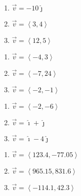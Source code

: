 \begin{multicols}{3}

\begin{enumerate}

\setcounter{enumi}{\value{HW}}

\item  $\vec{v} = -10 \hat{\jmath}$
\item  $\vec{v} = \left< 3,4\right>$
\item  $\vec{v} = \left<12, 5\right>$

\setcounter{HW}{\value{enumi}}

\end{enumerate}

\end{multicols}

\begin{multicols}{3}

\begin{enumerate}

\setcounter{enumi}{\value{HW}}

\item $\vec{v} = \left<-4, 3 \right>$
\item  $\vec{v} = \left<-7, 24\right>$
\item $\vec{v} = \left<-2, -1 \right>$

\setcounter{HW}{\value{enumi}}

\end{enumerate}

\end{multicols}

\begin{multicols}{3}

\begin{enumerate}

\setcounter{enumi}{\value{HW}}

\item  $\vec{v} = \left<-2, -6\right>$
\item  $\vec{v} = \hat{\imath} + \hat{\jmath}$
\item  $\vec{v} = \hat{\imath} - 4\hat{\jmath}$

\setcounter{HW}{\value{enumi}}

\end{enumerate}

\end{multicols}

\begin{multicols}{3}

\begin{enumerate}

\setcounter{enumi}{\value{HW}}

\item  $\vec{v} = \left<123.4, -77.05\right>$
\item  $\vec{v} = \left<965.15, 831.6\right>$
\item  $\vec{v} = \left<-114.1, 42.3\right>$ \label{findmaganglelast}

\setcounter{HW}{\value{enumi}}

\end{enumerate}

\end{multicols}

